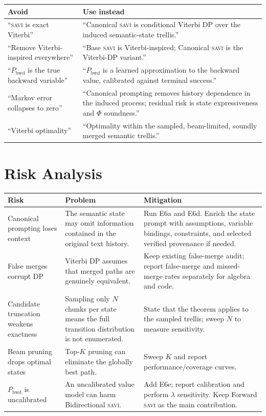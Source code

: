 \documentclass[11pt,letterpaper]{article}
\newcommand{\Phifn}{\Phi}
\newcommand{\Pbwd}{P_{\mathrm{bwd}}}
\newcommand{\SAVI}{\textsc{savi}\xspace}
\begin{document}
\begin{center}
\small
\begin{tabularx}{\linewidth}{lX}
\toprule
\textbf{Avoid} & \textbf{Use instead} \\
\midrule
``\SAVI is exact Viterbi''
  & ``Canonical \SAVI is conditional Viterbi DP over the induced semantic-state trellis.'' \\
\addlinespace
``Remove Viterbi-inspired everywhere''
  & ``Base \SAVI is Viterbi-inspired; Canonical \SAVI is the Viterbi-DP variant.'' \\
\addlinespace
``$\Pbwd$ is the true backward variable''
  & ``$\Pbwd$ is a learned approximation to the backward value, calibrated against terminal
    success.'' \\
\addlinespace
``Markov error collapses to zero''
  & ``Canonical prompting removes history dependence in the induced process; residual risk is
    state expressiveness and $\Phifn$ soundness.'' \\
\addlinespace
``Viterbi optimality''
  & ``Optimality within the sampled, beam-limited, soundly merged semantic trellis.'' \\
\bottomrule
\end{tabularx}
\end{center}

\section{Risk Analysis}

\begin{center}
\small
\begin{tabularx}{\linewidth}{lXX}
\toprule
\textbf{Risk} & \textbf{Problem} & \textbf{Mitigation} \\
\midrule
Canonical prompting loses context
  & The semantic state may omit information contained in the original text history.
  & Run E6a and E6d. Enrich the state prompt with assumptions, variable bindings, constraints,
    and selected verified provenance if needed. \\
\addlinespace
False merges corrupt DP
  & Viterbi DP assumes that merged paths are genuinely equivalent.
  & Keep existing false-merge audit; report false-merge and missed-merge rates separately
    for algebra and code. \\
\addlinespace
Candidate truncation weakens exactness
  & Sampling only $N$ chunks per state means the full transition distribution is not enumerated.
  & State that the theorem applies to the sampled trellis; sweep $N$ to measure sensitivity. \\
\addlinespace
Beam pruning drops optimal states
  & Top-$K$ pruning can eliminate the globally best path.
  & Sweep $K$ and report performance/coverage curves. \\
\addlinespace
$\Pbwd$ is uncalibrated
  & An uncalibrated value model can harm Bidirectional \SAVI.
  & Add E6e; report calibration and perform $\lambda$ sensitivity.
    Keep Forward \SAVI as the main contribution. \\
\bottomrule
\end{tabularx}
\end{center}
\end{document}
